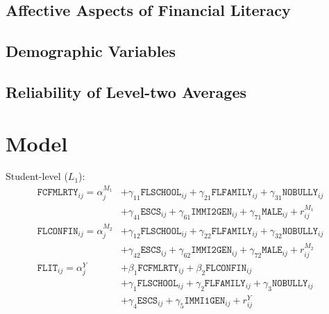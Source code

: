 \documentclass[a4paper,11pt,UKenglish,twoside,openright]{report}\usepackage[]{graphicx}\usepackage[]{color}
\begin{document}
\subsection{Affective Aspects of Financial Literacy}

\subsection{Demographic Variables}

\subsection{Reliability of Level-two Averages}

\section{Model}

Student-level ($L_1$):
\begin{equation}
    \begin{aligned}
        \texttt{FCFMLRTY}_{ij} = \alpha^{M_1}_{j} &+ \gamma_{11}\texttt{FLSCHOOL}_{ij} + \gamma_{21}\texttt{FLFAMILY}_{ij} + \gamma_{31}\texttt{NOBULLY}_{ij}\\
        &+ \gamma_{41}\texttt{ESCS}_{ij} + \gamma_{61}\texttt{IMMI2GEN}_{ij} + \gamma_{71}\texttt{MALE}_{ij} + r^{M_1}_{ij}\\
        \texttt{FLCONFIN}_{ij} = \alpha^{M_2}_{j} &+ \gamma_{12}\texttt{FLSCHOOL}_{ij} + \gamma_{22}\texttt{FLFAMILY}_{ij} + \gamma_{32}\texttt{NOBULLY}_{ij}\\
        &+ \gamma_{42}\texttt{ESCS}_{ij} + \gamma_{62}\texttt{IMMI2GEN}_{ij} + \gamma_{72}\texttt{MALE}_{ij} + r^{M_2}_{ij}\\
        \texttt{FLIT}_{ij} = \alpha^{Y}_{j} &+ \beta_1\texttt{FCFMLRTY}_{ij} + \beta_2\texttt{FLCONFIN}_{ij}\\
        &+ \gamma_1\texttt{FLSCHOOL}_{ij} + \gamma_2\texttt{FLFAMILY}_{ij}+ \gamma_3\texttt{NOBULLY}_{ij} \\
        &+ \gamma_4\texttt{ESCS}_{ij} + \gamma_5\texttt{IMMI1GEN}_{ij} + r^{Y}_{ij}
    \end{aligned}
\end{equation}
\end{document}
